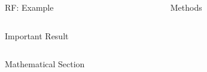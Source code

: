 \documentclass[final]{beamer}
\newlength{\onecolwid}
\newlength{\twocolwid}
\begin{document}
\begin{frame}[t]
\begin{columns}[t]
\begin{column}{\twocolwid}
\begin{columns}[t,totalwidth=\twocolwid]
\begin{column}{\onecolwid}
\begin{block}{RF: Example}

\end{block}

\end{column} %

\begin{column}{\onecolwid}\vspace{-.6in} %

\begin{block}{Methods}

\end{block}

\end{column} %

\end{columns} %

\begin{alertblock}{Important Result}

\end{alertblock}


\begin{columns}[t,totalwidth=\twocolwid] %

\begin{column}{\onecolwid} %


\begin{block}{Mathematical Section}


\end{block}


\end{column} %

\begin{column}{\onecolwid} %



\end{column}
\end{columns}
\end{column}
\end{columns}
\end{frame}
\end{document}
